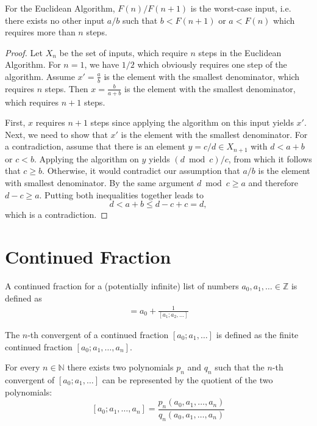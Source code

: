\documentclass[english,version-2020-11]{uzl-thesis}
\newcommand\N{{\mathbb N}}
\newcommand\Z{{\mathbb Z}}
\begin{document}
\begin{lemma}
  For the Euclidean Algorithm, $F(n) / F(n+1)$ is the worst-case input,
  i.e. there exists no other input $a / b$ such that $b < F(n + 1)$ or
  $a < F(n)$ which requires more than $n$ steps.
\end{lemma}

\begin{proof}
  Let $X_n$ be the set of inputs, which require $n$ steps in the Euclidean Algorithm.
  For $n = 1$, we have $1/2$ which obviously requires one step of the algorithm.
  Assume $x' = \frac{a}{b}$ is the element with the smallest denominator, which
  requires $n$ steps.
  Then $x = \frac{b}{a+b}$ is the element with the smallest denominator,
  which requires $n + 1$ steps.

  First, $x$ requires $n + 1$ steps since applying the algorithm on this input
  yields $x'$.
  Next, we need to show that $x'$ is the element with the smallest denominator.
  For a contradiction, assume that there is an element $y = c/d \in X_{n+1}$
  with $d < a + b$ or $c < b$.
  Applying the algorithm on $y$ yields $(d \bmod c) / c$,
  from which it follows that $c \ge b$.
  Otherwise, it would contradict our assumption that $a/b$ is the element with
  smallest denominator.
  By the same argument $d \bmod c \ge a$ and therefore $d - c \ge a$.
  Putting both inequalities together leads to
  \[
    d < a + b \le d - c + c = d,
  \]
  which is a contradiction.
\end{proof}

\section{Continued Fraction}

\begin{definition}
  A continued fraction for a (potentially infinite) list of numbers $a_0, a_1,
  \dots \in \Z$ is defined as
  \begin{align*}
    [a_0; a_1, \dots] = a_0 + \frac{1}{[a_1; a_2, \dots]}
  \end{align*}
\end{definition}

\begin{definition}
  The $n$-th convergent of a continued fraction $[a_0; a_1, \dots]$
  is defined as the finite continued fraction $[a_0; a_1, \dots, a_n]$.
\end{definition}

\begin{lemma}
  For every $n \in \N$ there exists two polynomials $p_n$ and $q_n$ such that the
  $n$-th convergent of $[a_0; a_1, \dots]$ can be represented by the quotient
  of the two polynomials:
  \[
    [a_0; a_1, \dots, a_n] = \frac{p_n(a_0, a_1, \dots, a_n)}{q_n(a_0, a_1, \dots, a_n)}
  \]
\end{lemma}
\end{document}
